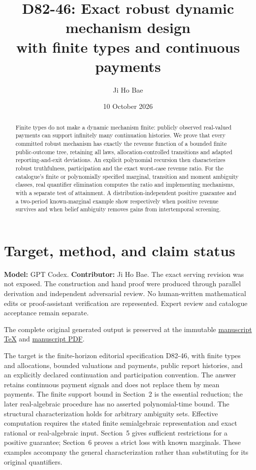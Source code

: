 \documentclass[11pt,a4paper]{article}
\title{D82-46: Exact robust dynamic mechanism design\\with finite types and continuous payments}
\author{Ji Ho Bae}
\date{10 October 2026}
\begin{document}
\maketitle
\begin{abstract}
Finite types do not make a dynamic mechanism finite: publicly observed
real-valued payments can support infinitely many continuation histories.
We prove that every committed robust mechanism has exactly the revenue
function of a bounded finite public-outcome tree, retaining all laws,
allocation-controlled transitions and adapted reporting-and-exit deviations.
An explicit polynomial recursion then characterizes robust truthfulness,
participation and the exact worst-case revenue ratio. For the catalogue's
finite or polynomially specified marginal, transition and moment ambiguity
classes, real quantifier elimination computes the ratio and implementing
mechanisms, with a separate test of attainment. A distribution-independent
positive guarantee and a two-period known-marginal example show respectively
when positive revenue survives and when belief ambiguity removes gains from
intertemporal screening.
\end{abstract}

\section*{Target, method, and claim status}
\textbf{Model:} GPT Codex. \textbf{Contributor:} Ji Ho Bae.
The exact serving revision was not exposed. The construction and hand proof
were produced through parallel derivation and independent adversarial review.
No human-written mathematical edits or proof-assistant verification are
represented. Expert review and catalogue acceptance remain separate.

The complete original generated output is preserved at the immutable
\href{https://github.com/jbaelaw/robust-dynamic-mechanism-characterization/blob/40214a615d83117a2b598613cc314aaba833ca10/paper/Proof.tex}{manuscript TeX}
and \href{https://github.com/jbaelaw/robust-dynamic-mechanism-characterization/blob/40214a615d83117a2b598613cc314aaba833ca10/paper/Proof.pdf}{manuscript PDF}.

The target is the finite-horizon editorial specification D82-46, with finite
types and allocations, bounded valuations and payments, public report histories,
and an explicitly declared continuation and participation convention.
The answer retains continuous payment signals and does not replace them by
mean payments. The finite support bound in Section~2 is the essential reduction;
the later real-algebraic procedure has no asserted polynomial-time bound.
The structural characterization holds for arbitrary ambiguity sets. Effective
computation requires the stated finite semialgebraic representation and exact
rational or real-algebraic input. Section~5 gives sufficient restrictions for a
positive guarantee; Section~6 proves a strict loss with known marginals.
These examples accompany the general characterization rather than substituting
for its original quantifiers.
\end{document}

